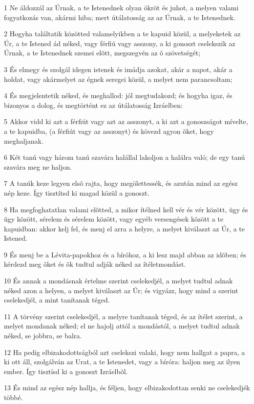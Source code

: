 \par 1 Ne áldozzál az Úrnak, a te Istenednek olyan ökröt és juhot, a melyen valami fogyatkozás van, akármi hiba; mert útálatosság az az Úrnak, a te Istenednek.
\par 2 Hogyha találtatik közötted valamelyikben a te kapuid közül, a melyeketek az Úr, a te Istened ád néked, vagy férfiú vagy asszony, a ki gonoszt cselekszik az Úrnak, a te Istenednek szemei elõtt, megszegvén az õ szövetségét;
\par 3 És elmegy és szolgál idegen istenek és imádja azokat, akár a napot, akár a holdat, vagy akármelyet az égnek seregei közül, a melyet nem parancsoltam;
\par 4 És megjelentetik néked, és meghallod: jól megtudakozd; és hogyha igaz, és bizonyos a dolog, és megtörtént ez az útálatosság Izráelben:
\par 5 Akkor vidd ki azt a férfiút vagy azt az asszonyt, a ki azt a gonoszságot mívelte, a te kapuidba, (a férfiút vagy az asszonyt) és kövezd agyon õket, hogy meghaljanak.
\par 6 Két tanú vagy három tanú szavára halállal lakoljon a halálra való; de egy tanú szavára meg ne haljon.
\par 7 A tanúk keze legyen elsõ rajta, hogy megölettessék, és azután mind az egész nép keze. Így tisztítsd ki magad közül a gonoszt.
\par 8 Ha megfoghatatlan valami elõtted, a mikor ítélned kell vér és vér között, ügy és ügy között, sérelem és sérelem között, vagy egyéb versengések között a te kapuidban: akkor kelj fel, és menj el arra a helyre, a melyet kiválaszt az Úr, a te Istened.
\par 9 És menj be a Lévita-papokhoz és a bíróhoz, a ki lesz majd abban az idõben; és kérdezd meg õket és õk tudtul adják néked az ítéletmondást.
\par 10 És annak a mondásnak értelme szerint cselekedjél, a melyet tudtul adnak néked azon a helyen, a melyet kiválaszt az Úr; és vigyázz, hogy mind a szerint cselekedjél, a mint tanítanak téged.
\par 11 A törvény szerint cselekedjél, a melyre tanítanak téged, és az ítélet szerint, a melyet mondanak néked; el ne hajolj attól a mondástól, a melyet tudtul adnak néked, se jobbra, se balra.
\par 12 Ha pedig elbizakodottságból azt cselekszi valaki, hogy nem hallgat a papra, a ki ott áll, szolgálván az Urat, a te Istenedet, vagy a bíróra: haljon meg az ilyen ember. Így tisztísd ki a gonoszt Izráelbõl.
\par 13 És mind az egész nép hallja, és féljen, hogy elbizakodottan senki ne cselekedjék többé.
